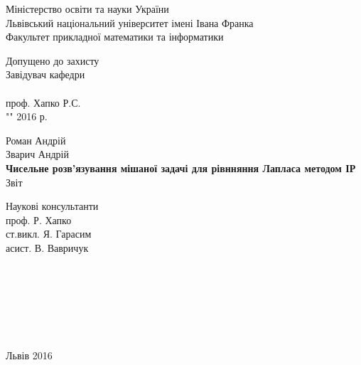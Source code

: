 \documentclass[a4 paper,12pt,ukrainian]{report}
\begin{document}
\titlepage
\begin{center}
\large {Міністерство освіти та науки України}\\
\large {Львівський національний університет імені Івана Франка}\\
\large {Факультет прикладної математики та інформатики}\\
\end{center}

\normalsize \vspace*{2cm}
\hspace*{11cm}Допущено до захисту\\
\hspace*{11cm}Завідувач кафедри\\
\hspace*{11cm}\underline{\hspace{3cm}}\\
\hspace*{11cm}проф. Хапко Р.С.\\
\hspace*{11cm}"\underline{\hspace{0.5cm}}"\underline{\hspace{2cm}} 2016 р.
\normalsize \vspace*{2cm}
\begin{center}
\large{Роман Андрій}\\
\large{Зварич Андрій}\\
\large{\textbf{Чисельне розв'язування мішаної задачі для рівнняння Лапласа методом ІР}}\\
\large{Звіт}\\
\end{center}
\normalsize \vspace*{3cm}
\hspace*{11cm}Наукові консультанти\\
\hspace*{11cm}проф. Р. Хапко\\
\hspace*{11cm}ст.викл. Я. Гарасим\\
\hspace*{11cm}асист. В. Вавричук\\
\\
\\
\\
\\
\\
\\
\large\centerline{Львів 2016}
\tableofcontents
\end{document}

